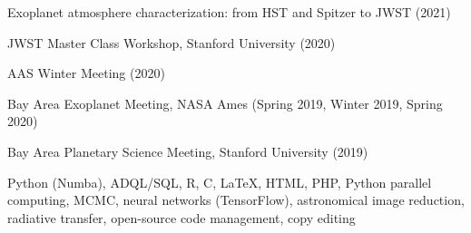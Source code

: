 \documentclass[12pt,letterpaper]{article}
\begin{document}
\begin{list}{}{\cvlist}
\item Exoplanet atmosphere characterization: from HST and Spitzer to JWST (2021)
\item JWST Master Class Workshop, Stanford University (2020)
\item AAS Winter Meeting (2020)
\item Bay Area Exoplanet Meeting, NASA Ames (Spring 2019, Winter 2019, Spring 2020)
\item Bay Area Planetary Science Meeting, Stanford University (2019)
\end{list}

\begin{list}{}{\cvlist}
\item Python (Numba), ADQL/SQL, R, C, \LaTeX, HTML, PHP, Python parallel computing, MCMC, neural networks (TensorFlow), astronomical image reduction, radiative transfer, open-source code management, copy editing
\end{list}
\end{document}

